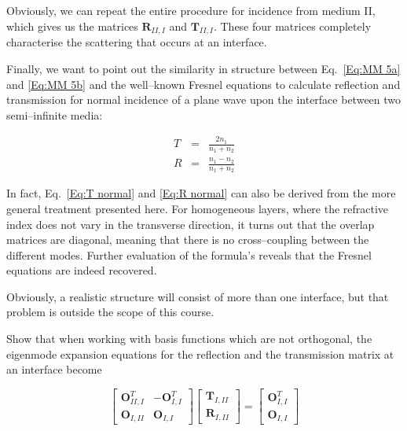 Obviously, we can repeat the entire procedure for incidence from medium II,
which gives us the matrices $\mathbf{R}_{II,I}$ and $\mathbf{T}_{II,I}$.
These four matrices completely characterise the scattering that occurs at an
interface.

Finally, we want to point out the similarity in structure between Eq.~\ref{Eq:MM 5a}
and \ref{Eq:MM 5b} and the well--known Fresnel equations to calculate reflection
and transmission for normal incidence of a plane wave upon the interface between
two semi--infinite media:

\begin{eqnarray}
T & = & \frac{2n_{1}}{n_{1}+n_{2}}\label{Eq:T normal} \\
R & = & \frac{n_{1}-n_{2}}{n_{1}+n_{2}}\label{Eq:R normal} 
\end{eqnarray}

In fact, Eq.~\ref{Eq:T normal} and \ref{Eq:R normal} can also be derived
from the more general treatment presented here. For homogeneous layers, where
the refractive index does not vary in the transverse direction, it turns out
that the overlap matrices are diagonal, meaning that there is no cross--coupling
between the different modes. Further evaluation of the formula's reveals that
the Fresnel equations are indeed recovered.

Obviously, a realistic structure will consist of more than one interface, but that problem is outside the scope of this course.


\begin{exer}
Show that when working with basis functions which are not orthogonal, the eigenmode expansion equations for the reflection and the transmission matrix at an interface become

$$ \begin{bmatrix} \mathbf{O}^{T}_{II,I} & -\mathbf{O}^{T}_{I,I} \\ \mathbf{O}_{I,II} & \mathbf{O}_{I,I} \end{bmatrix} \begin{bmatrix} \mathbf{T}_{I,II} \\ \mathbf{R}_{I,II} \end{bmatrix} =  \begin{bmatrix} \mathbf{O}^{T}_{I,I} \\ \mathbf{O}_{I,I} \end{bmatrix} $$

\end{exer}


\pagebreak


